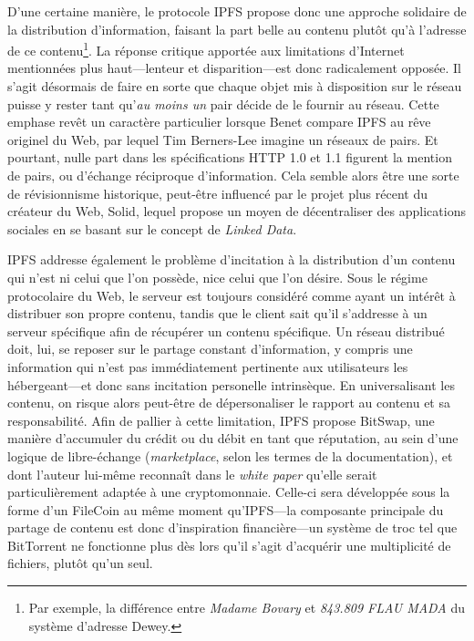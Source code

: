 \documentclass{article}
\begin{document}
D'une certaine manière, le protocole IPFS propose donc une approche solidaire de la distribution d'information, faisant la part belle au contenu plutôt qu'à l'adresse de ce contenu\footnote{Par exemple, la différence entre \emph{Madame Bovary} et \emph{843.809 FLAU MADA} du système d'adresse Dewey.}. La réponse critique apportée aux limitations d'Internet mentionnées plus haut—lenteur et disparition—est donc radicalement opposée. Il s'agit désormais de faire en sorte que chaque objet mis à disposition sur le réseau puisse y rester tant qu'\emph{au moins un} pair décide de le fournir au réseau. Cette emphase revêt un caractère particulier lorsque Benet compare IPFS au rêve originel du Web, par lequel Tim Berners-Lee imagine un réseaux de pairs\cite{protocol_labs_history_nodate}. Et pourtant, nulle part dans les spécifications HTTP 1.0 et 1.1 figurent la mention de pairs, ou d'échange réciproque d'information. Cela semble alors être une sorte de révisionnisme historique, peut-être influencé par le projet plus récent du créateur du Web, Solid\cite{berners-lee_one_2018}, lequel propose un moyen de décentraliser des applications sociales en se basant sur le concept de \emph{Linked Data}.

IPFS addresse également le problème d'incitation à la distribution d'un contenu qui n'est ni celui que l'on possède, nice celui que l'on désire. Sous le régime protocolaire du Web, le serveur est toujours considéré comme ayant un intérêt à distribuer son propre contenu, tandis que le client sait qu'il s'addresse à un serveur spécifique afin de récupérer un contenu spécifique. Un réseau distribué doit, lui, se reposer sur le partage constant d'information, y compris une information qui n'est pas immédiatement pertinente aux utilisateurs les hébergeant—et donc sans incitation personelle intrinsèque. En universalisant les contenu, on risque alors peut-être de dépersonaliser le rapport au contenu et sa responsabilité. Afin de pallier à cette limitation, IPFS propose BitSwap, une manière d'accumuler du crédit ou du débit en tant que réputation, au sein d'une logique de libre-échange (\emph{marketplace}, selon les termes de la documentation\cite{protocol_labs_bitswap_2019}), et dont l'auteur lui-même reconnaît dans le \emph{white paper} qu'elle serait particulièrement adaptée à une cryptomonnaie. Celle-ci sera développée sous la forme d'un FileCoin au même moment qu'IPFS\cite{protocol_labs_filecoin_2014}—la composante principale du partage de contenu est donc d'inspiration financière—un système de troc tel que BitTorrent ne fonctionne plus dès lors qu'il s'agit d'acquérir une multiplicité de fichiers, plutôt qu'un seul.
\end{document}
